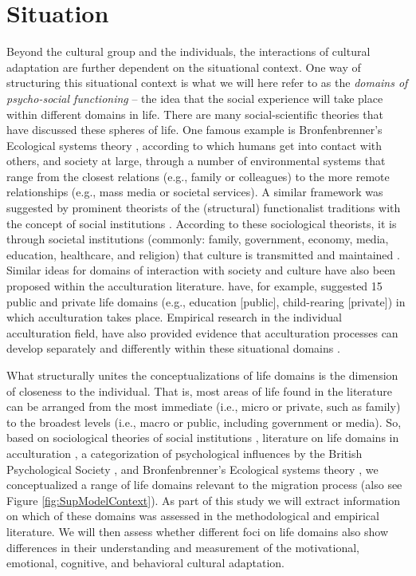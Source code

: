 \documentclass[man, 12pt, a4paper]{apa7}
\begin{document}
\section{Situation} 
Beyond the cultural group and the individuals, the interactions of cultural adaptation are further dependent on the situational context. One way of structuring this situational context is what we will here refer to as the \textit{domains of psycho-social functioning} -- the idea that the social experience will take place within different domains in life. There are many social-scientific theories that have discussed these spheres of life. One famous example is Bronfenbrenner's Ecological systems theory \citep{Bronfenbrenner1992}, according to which humans get into contact with others, and society at large, through a number of environmental systems that range from the closest relations (e.g., family or colleagues) to the more remote relationships (e.g., mass media or societal services). A similar framework was suggested by prominent theorists of the (structural) functionalist traditions with the concept of social institutions \citep[e.g.,][]{Turner1997}. According to these sociological theorists, it is through societal institutions (commonly: family, government, economy, media, education, healthcare, and religion) that culture is transmitted and maintained \citep[e.g.,][]{Durkheim1982}. Similar ideas for domains of interaction with society and culture have also been proposed within the acculturation literature. \citet{Arends-Toth2006, Arends-Toth2007} have, for example, suggested 15 public and private life domains (e.g., education [public], child-rearing [private]) in which acculturation takes place. Empirical research in the individual acculturation field, have also provided evidence that acculturation processes can develop separately and differently within these situational domains \citep[e.g.,][]{Arends-Toth2003a}. 

What structurally unites the conceptualizations of life domains is the dimension of closeness to the individual. That is, most areas of life found in the literature can be arranged from the most immediate (i.e., micro or private, such as family) to the broadest levels (i.e., macro or public, including government or media). So, based on sociological theories of social institutions \citep{Durkheim1982}, literature on life domains in acculturation \citep{Arends-Toth2006, Arends-Toth2007, Zane2004}, a categorization of psychological influences by the British Psychological Society \citep{Michie2005a}, and Bronfenbrenner's Ecological systems theory \citep{Bronfenbrenner1992}, we conceptualized a range of life domains relevant to the migration process (also see Figure \ref{fig:SupModelContext}). As part of this study we will extract information on which of these domains was assessed in the methodological and empirical literature. We will then assess whether different foci on life domains also show differences in their understanding and measurement of the motivational, emotional, cognitive, and behavioral cultural adaptation.
\end{document}
